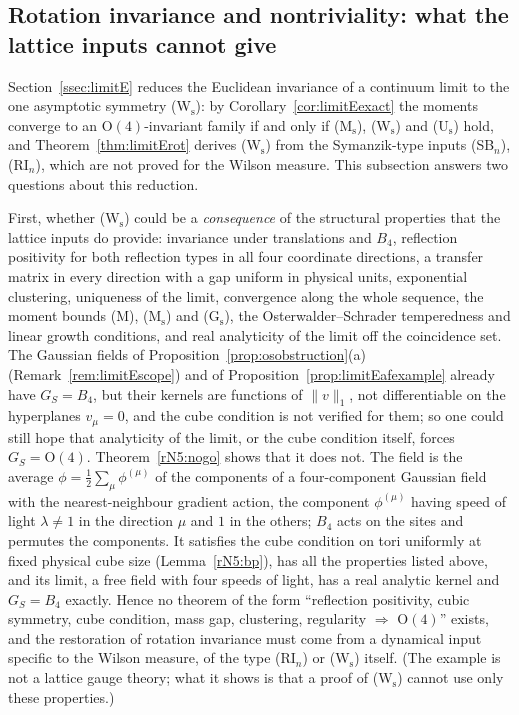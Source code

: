 \subsection{Rotation invariance and nontriviality: what the lattice inputs
cannot give}\label{rN5:sec}

Section~\ref{ssec:limitE} reduces the Euclidean invariance of a continuum
limit to the one asymptotic symmetry (W$_{\mathrm s}$): by
Corollary~\ref{cor:limitEexact} the moments converge to an
$\mathrm O(4)$-invariant family if and only if (M$_{\mathrm s}$),
(W$_{\mathrm s}$) and (U$_{\mathrm s}$) hold, and
Theorem~\ref{thm:limitErot} derives (W$_{\mathrm s}$) from the Symanzik-type
inputs (SB$_n$), (RI$_n$), which are not proved for the Wilson measure. This
subsection answers two questions about this reduction.

First, whether (W$_{\mathrm s}$) could be a \emph{consequence} of the
structural properties that the lattice inputs do provide: invariance under
translations and $B_4$, reflection positivity for both reflection types in
all four coordinate directions, a transfer matrix in every direction with a
gap uniform in physical units, exponential clustering, uniqueness of the
limit, convergence along the whole sequence, the moment bounds (M),
(M$_{\mathrm s}$) and (G$_{\mathrm s}$), the Osterwalder--Schrader
temperedness and linear growth conditions, and real analyticity of the
limit off the coincidence set. The Gaussian fields of
Proposition~\ref{prop:osobstruction}(a) (Remark~\ref{rem:limitEscope}) and
of Proposition~\ref{prop:limitEafexample} already have $G_S=B_4$, but their
kernels are functions of $\|v\|_1$, not differentiable on the hyperplanes
$v_\mu=0$, and the cube condition is not verified for them; so one could
still hope that analyticity of the limit, or the cube condition itself,
forces $G_S=\mathrm O(4)$. Theorem~\ref{rN5:nogo} shows that it does not.
The field is the average $\phi=\frac12\sum_\mu\phi^{(\mu)}$ of the
components of a four-component Gaussian field with the nearest-neighbour
gradient action, the component $\phi^{(\mu)}$ having speed of light
$\lambda\ne1$ in the direction $\mu$ and $1$ in the others; $B_4$ acts on
the sites and permutes the components. It satisfies the cube condition on
tori uniformly at fixed physical cube size (Lemma~\ref{rN5:bp}), has all
the properties listed above, and its limit, a free field with four speeds
of light, has a real analytic kernel and $G_S=B_4$ exactly. Hence no
theorem of the form ``reflection positivity, cubic symmetry, cube
condition, mass gap, clustering, regularity $\Rightarrow$ $\mathrm O(4)$''
exists, and the restoration of rotation invariance must come from a
dynamical input specific to the Wilson measure, of the type (RI$_n$) or
(W$_{\mathrm s}$) itself. (The example is not a lattice gauge theory; what
it shows is that a proof of (W$_{\mathrm s}$) cannot use only these
properties.)


